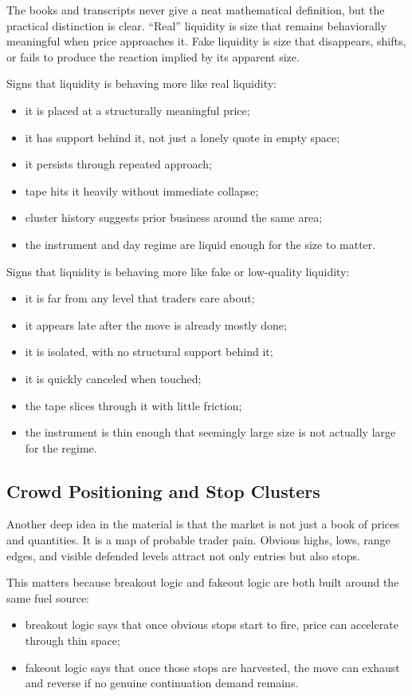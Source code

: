 The books and transcripts never give a neat mathematical definition, but the practical distinction is clear.
``Real'' liquidity is size that remains behaviorally meaningful when price approaches it.
Fake liquidity is size that disappears, shifts, or fails to produce the reaction implied by its apparent size.

Signs that liquidity is behaving more like real liquidity:
\begin{itemize}
  \item it is placed at a structurally meaningful price;
  \item it has support behind it, not just a lonely quote in empty space;
  \item it persists through repeated approach;
  \item tape hits it heavily without immediate collapse;
  \item cluster history suggests prior business around the same area;
  \item the instrument and day regime are liquid enough for the size to matter.
\end{itemize}

Signs that liquidity is behaving more like fake or low-quality liquidity:
\begin{itemize}
  \item it is far from any level that traders care about;
  \item it appears late after the move is already mostly done;
  \item it is isolated, with no structural support behind it;
  \item it is quickly canceled when touched;
  \item the tape slices through it with little friction;
  \item the instrument is thin enough that seemingly large size is not actually large for the regime.
\end{itemize}

\subsection{Crowd Positioning and Stop Clusters}

Another deep idea in the material is that the market is not just a book of prices and quantities.
It is a map of probable trader pain.
Obvious highs, lows, range edges, and visible defended levels attract not only entries but also stops.

This matters because breakout logic and fakeout logic are both built around the same fuel source:
\begin{itemize}
  \item breakout logic says that once obvious stops start to fire, price can accelerate through thin space;
  \item fakeout logic says that once those stops are harvested, the move can exhaust and reverse if no genuine continuation demand remains.
\end{itemize}

